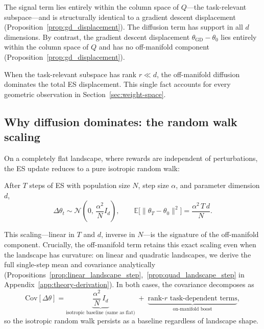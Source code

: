 The signal term lies entirely within the column space of $Q$---the task-relevant subspace---and is structurally identical to a gradient descent displacement (Proposition~\ref{prop:gd_displacement}). The diffusion term has support in all $d$ dimensions. 
By contrast, the gradient descent displacement $\theta_{\mathrm{GD}} - \theta_0$ lies entirely within the column space of $Q$ and has no off-manifold component (Proposition~\ref{prop:gd_displacement}).

When the task-relevant subspace has rank $r \ll d$, the off-manifold diffusion dominates the total ES displacement. This single fact accounts for every geometric observation in Section~\ref{sec:weight-space}.


\subsection{Why diffusion dominates: the random walk scaling}

On a completely flat landscape, where rewards are independent of perturbations, the ES update reduces to a pure isotropic random walk:
\begin{proposition}
\label{prop:flat_main}
After $T$ steps of ES with population size $N$, step size $\alpha$, and parameter dimension $d$,
\begin{equation}\label{eq:flat_RW}
    \Delta\theta_t \sim \mathcal{N}\!\left(0,\, \frac{\alpha^2}{N} I_d\right), 
    \qquad
    \mathbb{E}\bigl[\|\theta_T - \theta_0\|^{2}\bigr] = \frac{\alpha^2\, T\, d}{N}.
\end{equation}
\end{proposition}

\noindent This scaling---linear in $T$ and $d$, inverse in $N$---is the signature of the off-manifold component. 
Crucially, the off-manifold term retains this exact scaling even when the landscape has curvature: on linear and quadratic landscapes, we derive the full single-step mean and covariance analytically (Propositions~\ref{prop:linear_landscape_step},~\ref{prop:quad_landscape_step} in Appendix~\ref{app:theory-derivation}). In both cases, the covariance decomposes as
\begin{equation}\label{eq:cov_structure}
    \mathrm{Cov}[\Delta\theta]
    = \underbrace{\frac{\alpha^2}{N}\,I_d}_{\text{isotropic baseline (same as flat)}}
    \;+\; \underbrace{\text{rank-}r\text{ task-dependent terms}}_{\text{on-manifold boost}},
\end{equation}
so the isotropic random walk persists as a baseline regardless of landscape shape.

